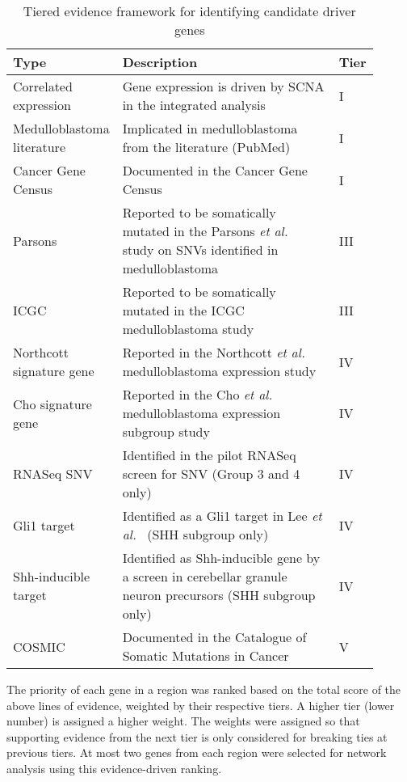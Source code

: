 \begin{table}[H]
	\caption[Tiered evidence framework for identifying candidate driver genes]
	{
		Tiered evidence framework for identifying candidate driver genes
	}
	\label{tab:driver-evidence}
	\scriptsize
	\setlength{\extrarowheight}{0.5em}
	\centering
	\begin{tabular}{ p{0.25\linewidth} | p{0.6\linewidth} | p{0.05\linewidth} }
		\hline
		\textbf{Type} & \textbf{Description} & \textbf{Tier} \\
		\hline
		Correlated expression & Gene expression is driven by SCNA in the integrated analysis & I \\
		Medulloblastoma literature & Implicated in medulloblastoma from the literature (PubMed) & I \\
		Cancer Gene Census & Documented in the Cancer Gene Census & I \\
		Parsons & Reported to be somatically mutated in the Parsons \emph{et al.}\ \citeref{parsons11} study on SNVs identified in medulloblastoma & III \\
		ICGC & Reported to be somatically mutated in the ICGC medulloblastoma study & III \\
		Northcott signature gene & Reported in the Northcott \emph{et al.}\ \citeref{northcott11a} medulloblastoma expression study & IV \\
		Cho signature gene & Reported in the Cho \emph{et al.}\ \citeref{cho11} medulloblastoma expression subgroup study & IV \\
		RNASeq SNV & Identified in the pilot RNASeq screen for SNV (Group 3 and 4 only) & IV \\
		Gli1 target & Identified as a Gli1 target in Lee \emph{et al.}\ \citeref{lee10} (SHH subgroup only) & IV \\
		Shh-inducible target & Identified as Shh-inducible gene by a screen in cerebellar granule neuron precursors (SHH subgroup only) & IV \\
		COSMIC & Documented in the Catalogue of Somatic Mutations in Cancer & V \\
		\hline
	\end{tabular}
\end{table}

The priority of each gene in a region was ranked based on the total score of the above lines of evidence, weighted by their respective tiers. A higher tier (lower number) is assigned a higher weight. The weights were assigned so that supporting evidence from the next tier is only considered for breaking ties at previous tiers. At most two genes from each region were selected for network analysis using this evidence-driven ranking.


